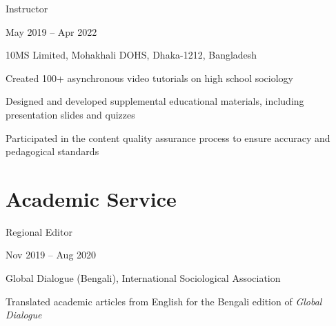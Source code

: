 \documentclass[letterpaper,10pt]{article}
\begin{document}
    \begin{minipage} {.75\linewidth} \begin{flushleft}
            Instructor
        \end{flushleft} \end{minipage}
    \hfill
    \begin{minipage} {.20\linewidth} \begin{flushright}
            May 2019 – Apr 2022
        \end{flushright} \end{minipage}
    10MS Limited, Mohakhali DOHS, Dhaka-1212, Bangladesh\\
    \vspace{0.3em}
    \begin{description} [font=$\bullet$]
        \item{Created 100+ asynchronous video tutorials on high school sociology}
        \item{Designed and developed supplemental educational materials, including presentation slides and quizzes}
        \item{Participated in the content quality assurance process to ensure accuracy and pedagogical standards}
    \end{description}
    \vspace{0.65em}

    \section{Academic Service}
    \begin{minipage} {.75\linewidth}
        \begin{flushleft}
            Regional Editor
        \end{flushleft}
    \end{minipage}
    \hfill
    \begin{minipage} {.20\linewidth}
        \begin{flushright}
            Nov 2019 – Aug 2020
        \end{flushright}
    \end{minipage}
    Global Dialogue (Bengali), International Sociological Association\\
     
    \begin{description}[font=$\bullet$]
    \item Translated academic articles from English for the Bengali edition of \textit{Global Dialogue}
    \end{description}
    \vspace{0.65em}
\end{document}
